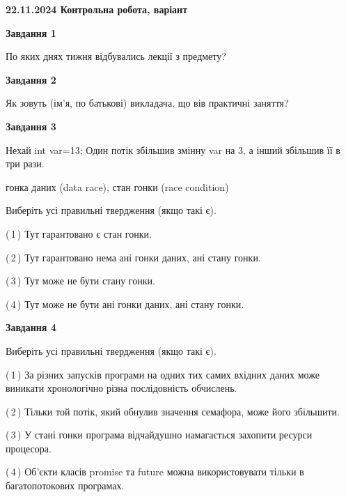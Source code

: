 \documentclass[12pt, ukrainian]{article}
\begin{document}
\begin {large}

\textbf{22.11.2024 Контрольна робота, варіант  }\par


{

\begin{center}
\textbf{Завдання 1}
\end{center}

По яких днях тижня відбувались лекції з предмету?


\begin{center}
\textbf{Завдання 2}
\end{center}

Як зовуть (ім'я, по батькові) викладача, що вів практичні заняття?


\begin{center}
\textbf{Завдання 3}
\end{center}

Нехай int var=13; Один потік збільшив змінну var на 3, а інший збільшив її в три рази.

гонка даних (data race), стан гонки (race condition)

Виберіть усі правильні твердження (якщо такі є).\par
\vspace{2mm}
(\,1\,) Тут гарантовано є стан гонки.%

(\,2\,) Тут гарантовано нема ані гонки даних, ані стану гонки.%

(\,3\,) Тут може не бути стану гонки.%

(\,4\,) Тут може не бути ані гонки даних, ані стану гонки.%


\begin{center}
\textbf{Завдання 4}
\end{center}

Виберіть усі правильні твердження (якщо такі є).\par
\vspace{2mm}

(\,1\,) За різних запусків програми на одних тих самих вхідних даних може виникати хронологічно різна послідовність обчислень.%

(\,2\,) Тільки той потік, який обнулив значення семафора, може його збільшити.%

(\,3\,) У стані гонки програма відчайдушно намагається захопити ресурси процесора.%

(\,4\,) Об’єкти класів promise та future можна використовувати тільки в багатопотокових програмах.%


}
\end{large}
\end{document}

